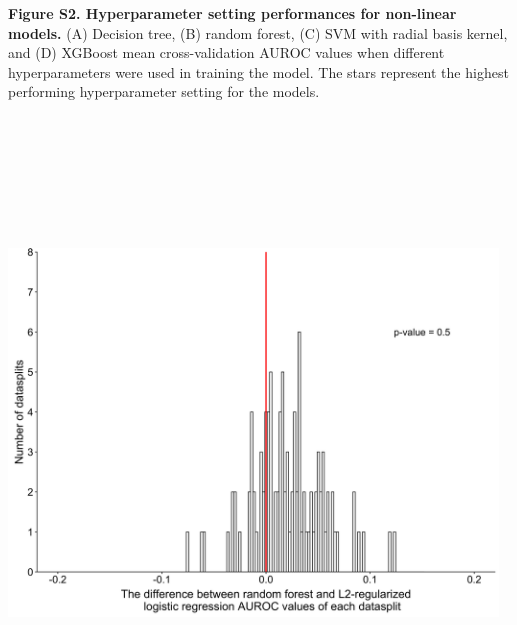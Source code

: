 \documentclass[11pt,]{article}
\begin{document}
\textbf{Figure S2. Hyperparameter setting performances for non-linear
models.} (A) Decision tree, (B) random forest, (C) SVM with radial basis
kernel, and (D) XGBoost mean cross-validation AUROC values when
different hyperparameters were used in training the model. The stars
represent the highest performing hyperparameter setting for the models.
\newpage
\includegraphics[height=17.5cm, width=13cm]{Figure_S3.png}
\end{document}
